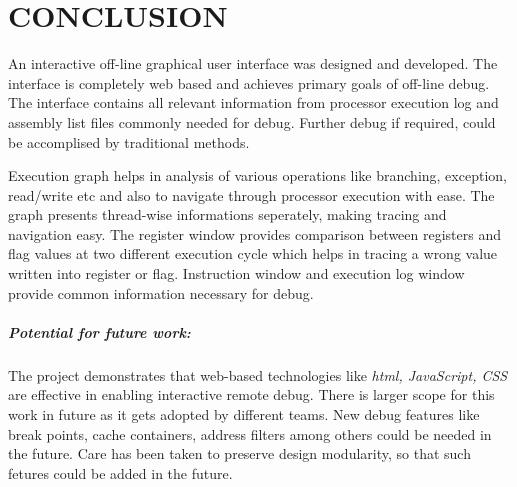 \chapter{CONCLUSION}
\label{chap:GUI_conclusion}

An interactive off-line graphical user interface was designed and developed. The interface is completely web based and achieves primary goals of off-line debug. The interface contains all relevant information from processor execution log and assembly list files commonly needed for debug. Further debug if required, could be accomplised by traditional methods.

Execution graph helps in analysis of various operations like branching, exception, read/write etc and also to navigate through processor execution with ease. The graph presents thread-wise informations seperately, making tracing and navigation easy. The register window provides comparison between registers and flag values at two different execution cycle which helps in tracing a wrong value written into register or flag. Instruction window and execution log window provide common information necessary for debug.

\paragraph{Potential for future work:} The project demonstrates that web-based technologies like {\it html, JavaScript, CSS} are effective in enabling interactive remote debug. There is larger scope for this work in future as it gets adopted by different teams. New debug features like break points, cache containers, address filters among others could be needed in the future. Care has been taken to preserve design modularity, so that such fetures could  be added in the future.

